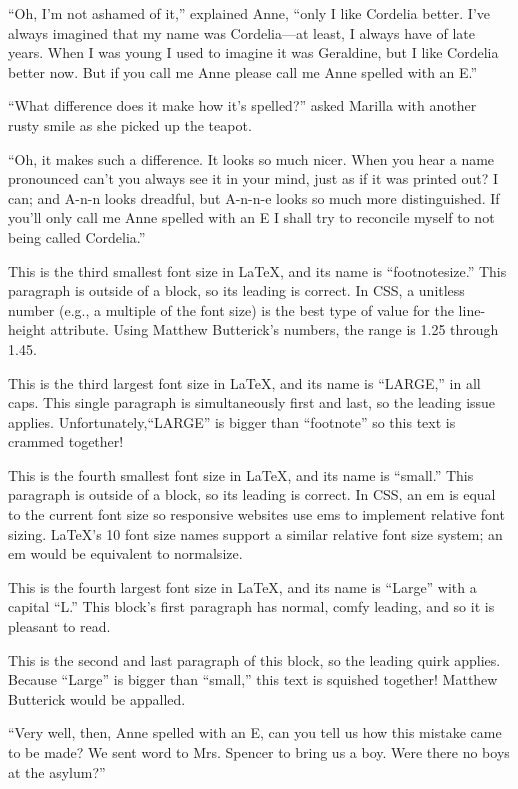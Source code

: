\documentclass[a4paper]{article}
\begin{document}
{\scriptsize ``Oh, I'm not ashamed of it,'' explained Anne, ``only I like Cordelia better. I've always imagined that my name was Cordelia---at least, I always have of late years. When I was young I used to imagine it was Geraldine, but I like Cordelia better now. But if you call me Anne please call me Anne spelled with an E.''

``What difference does it make how it's spelled?'' asked Marilla with another rusty smile as she picked up the teapot.

``Oh, it makes such a difference. It looks so much nicer. When you hear a name pronounced can't you always see it in your mind, just as if it was printed out? I can; and A-n-n looks dreadful, but A-n-n-e looks so much more distinguished. If you'll only call me Anne spelled with an E I shall try to reconcile myself to not being called Cordelia.''}

\footnotesize This is the third smallest font size in \LaTeX, and its name is ``footnotesize.'' This paragraph is outside of a block, so its leading is correct. In CSS, a unitless number (e.g., a multiple of the font size) is the best type of value for the line-height attribute.  Using Matthew Butterick's numbers, the range is 1.25 through 1.45.

{\LARGE This is the third largest font size in \LaTeX, and its name is ``LARGE,'' in all caps. This single paragraph is simultaneously first and last, so the leading issue applies. Unfortunately,``LARGE'' is bigger than ``footnote''  so this text is crammed together!}

\small This is the fourth smallest font size in \LaTeX, and its name is ``small.'' This paragraph is outside of a block, so its leading is correct. In CSS, an em is equal to the current font size so responsive websites use ems to implement relative font sizing. \LaTeX's 10 font size names support a similar relative font size system; an em would be equivalent to normalsize.

{\Large This is the fourth largest font size in \LaTeX, and its name is ``Large'' with a capital ``L.'' This block's first paragraph has normal, comfy leading, and so it is pleasant to read.

This is the second and last paragraph of this block, so the leading quirk applies. Because ``Large'' is bigger than ``small,'' this text is squished together! Matthew Butterick would be appalled.}

\footnotesize ``Very well, then, Anne spelled with an E, can you tell us how this mistake came to be made? We sent word to Mrs. Spencer to bring us a boy. Were there no boys at the asylum?''
\end{document}

